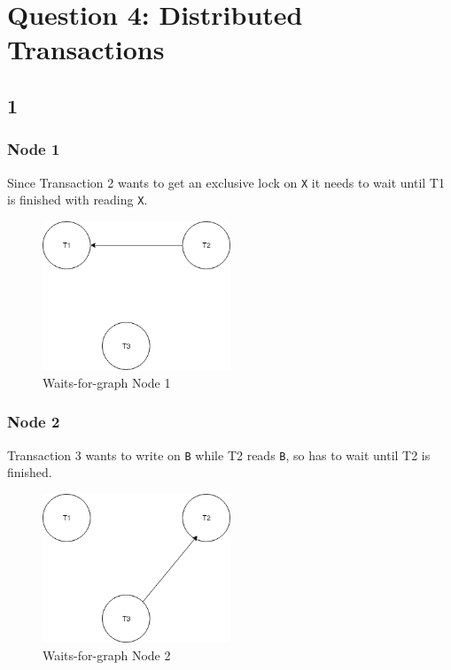 \newpage
\section{Question 4: Distributed Transactions}

\subsection{1}

\subsubsection{Node 1}
Since Transaction 2 wants to get an exclusive lock on \texttt{X} it needs to wait until T1 is finished with reading \texttt{X}.
\begin{figure}[htb!]
	\center
	\includegraphics[width=0.5\textwidth]{img/Node1}
	\caption{Waits-for-graph Node 1}
\end{figure}

\subsubsection{Node 2}
Transaction 3 wants to write on \texttt{B} while T2 reads \texttt{B}, so has to wait until T2 is finished.
\begin{figure}[htb!]
	\center
	\includegraphics[width=0.5\textwidth]{img/Node2}
	\caption{Waits-for-graph Node 2}
\end{figure}

